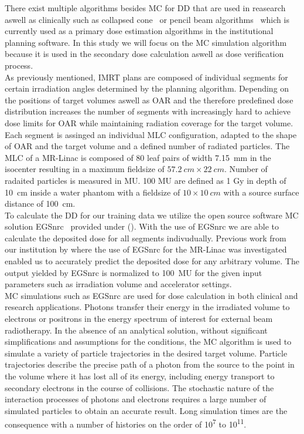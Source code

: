 There exist multiple algorithms besides \acs{MC} for \acs{DD} that are used in reasearch aswell as clinically such as collapsed cone~\cite{ahnesjo_collapsed_1989} or pencil beam algorithms~\cite{mohan_differential_1986} which is currently used as a primary dose estimation algorithms in the institutional planning software.
In this study we will focus on the \acs{MC} simulation algorithm because it is used in the secondary dose calculation aswell as dose verification process.\\
As previously mentioned, \acs{IMRT} plans are composed of individual segments for certain irradiation angles determined by the planning algorithm.
Depending on the positions of target volumes aswell as \acs{OAR} and the therefore predefined dose distribution increases the number of segments with increasingly hard to achieve dose limits for \acs{OAR} while maintaining radiation coverage for the target volume. 
Each segment is assinged an individual \acs{MLC} configuration, adapted to the shape of \acs{OAR} and the target volume and a defined number of radiated particles.
The \acs{MLC} of a MR-Linac is composed of 80 leaf pairs of width 7.15~mm in the isocenter resulting in a maximum fieldsize of $57.2~cm \times 22~cm$.
Number of radaited particles is measured in \ac{MU}.
100 \acs{MU} are defined as 1 Gy in depth of 10~cm inside a water phantom with a fieldsize of $10 \times 10~cm$ with a source surface distance of 100~cm.\\
To calculate the \acs{DD} for our training data we utilize the open source software \acs{MC} solution EGSnrc~\cite{noauthor_nrc-cnrcegsnrc_2021} provided under ().
With the use of EGSnrc we are able to calculate the deposited dose for all segments indivudually. 
Previous work from our institution by \citeauthor{friedel_development_2019} where the use of EGSnrc for the MR-Linac was investigated enabled us to accurately predict the deposited dose for any arbitrary volume.
The output yielded by EGSnrc is normalized to 100~\acs{MU} for the given input parameters such as irradiation volume and accelerator settings.\\

\acs{MC} simulations such as EGSnrc are used for dose calculation in both clinical and research applications.
Photons transfer their energy in the irradiated volume to electrons or positrons in the energy spectrum of interest for external beam radiotherapy. 
In the absence of an analytical solution, without significant simplifications and assumptions for the conditions, the \acs{MC} algorithm is used to simulate a variety of particle trajectories in the desired target volume.
Particle trajectories describe the precise path of a photon from the source to the point in the volume where it has lost all of its energy, including energy transport to secondary electrons in the course of collisions.
The stochastic nature of the interaction processes of photons and electrons requires a large number of simulated particles to obtain an accurate result. 
Long simulation times are the consequence with a number of histories on the order of 10\textsuperscript{7} to 10\textsuperscript{11}.